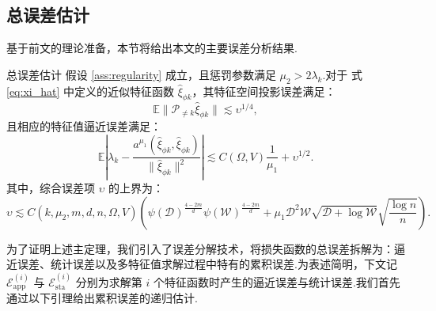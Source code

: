 \subsection{总误差估计}\label{subsec_main}
基于前文的理论准备，本节将给出本文的主要误差分析结果.
\begin{theorem}{总误差估计}\label{mainthm}
假设 \ref{ass:regularity} 成立，且惩罚参数满足 $\mu_{2}>2\lambda_{k}$.对于 式\eqref{eq:xi_hat} 中定义的近似特征函数 $\widehat{\xi}_{\phi k}$，其特征空间投影误差满足：
\begin{equation*}
\mathbb{E} \|\mathcal{P}_{\neq k}\widehat{\xi}_{\phi k}\|\lesssim \upsilon^{1/4},
\end{equation*}
且相应的特征值逼近误差满足：
\begin{equation*}
\displaystyle\mathbb{E}\left|\lambda_{k}-\frac{a^{\mu_{1}}(\widehat{\xi}_{\phi k},\widehat{\xi}_{\phi k})}{\|\widehat{\xi}_{\phi k}\|^{2}}\right|\lesssim C(\Omega,V)\frac{1}{\mu_{1}}+\upsilon^{1/2}.
\end{equation*}
其中，综合误差项 $\upsilon$ 的上界为：
\begin{equation*}
\upsilon\lesssim C(k,\mu_{2},m,d,n,\Omega,V)\left(
\psi(\mathcal{D})^{\frac{4-2m}{d}}\psi(\mathcal{W})^{\frac{4-2m}{d}}
+
\mu_{1}\mathcal{D}^2 \mathcal{W} \sqrt{\mathcal{D}+\log \mathcal{W}}\sqrt{\frac{\log n}{n}}
\right).
\end{equation*}
\end{theorem}
为了证明上述主定理，我们引入了误差分解技术，将损失函数的总误差拆解为：逼近误差、统计误差以及多特征值求解过程中特有的累积误差.为表述简明，下文记 $\mathcal{E}_{\text{app}}^{(i)}$ 与 $\mathcal{E}_{\text{sta}}^{(i)}$ 分别为求解第 $i$ 个特征函数时产生的逼近误差与统计误差.我们首先通过以下引理给出累积误差的递归估计.

